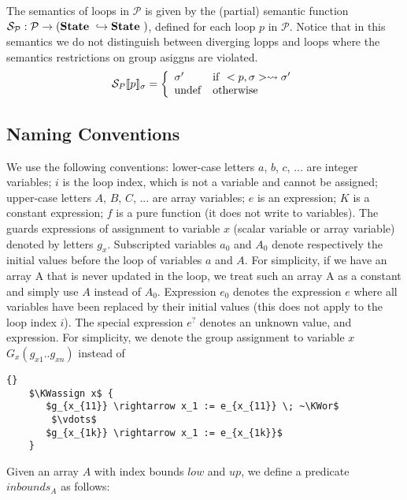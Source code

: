 \documentclass[a4paper,10pt]{article}
\newcommand{\prog}{\ensuremath{\mathcal{P}}\xspace}
\newcommand{\idx}{\ensuremath{i}\xspace}
\newcommand{\KWassign}{\ensuremath{\mathrm{\textbf{assign}}~}}
\newcommand{\KWor}{\ensuremath{\mathrm{\textbf{or}}~}}
\newcommand{\Sstate}{\ensuremath{\mathrm{\textbf{State}}~}}
\newcommand{\SemF}[3]{\ensuremath{#1 \llbracket #2 \rrbracket_{#3} \xspace}}
\newcommand{\Pinbounds}[1]{\ensuremath{\mathit{inbounds}_{#1}}\xspace}
\newcommand{\group}[2]{\ensuremath{\mathit{G}_{#1}(#2)}\xspace}
\begin{document}
The semantics of loops in \prog is given by the (partial) semantic function
${\cal S_P}:  {\cal P} \rightarrow (\Sstate \hookrightarrow \Sstate)$,
defined for each loop $p$ in \prog. Notice that in this semantics we do not 
distinguish between diverging lopps and loops where the semantics restrictions 
on group asiggns are violated.
$$
\SemF{{\cal S}_P}{p}{\sigma} = \left \{
\begin{array}{ll}
\sigma' & \mathrm{if ~} \eval{p}{\sigma} \rightsquigarrow \sigma'\\
\mathrm{undef}  & \mathrm{otherwise}\\
\end{array}
\right.
$$

\subsection{Naming Conventions}
\label{sec:naming-conventions}

We use the following conventions: lower-case letters $a$, $b$, $c$, ... are integer
variables; \idx is the loop index, which is not a variable and cannot be
assigned; upper-case letters $A$, $B$, $C$, ... are array variables; $e$ is an
expression; $K$ is a constant expression; $f$ is a pure function (it does not
write to variables). The guards expressions of assignment to variable $x$ (scalar variable or
array variable) denoted by letters $g_x$. Subscripted variables $a_0$ and $A_0$ denote
respectively the initial values before the loop of variables $a$ and $A$.
For simplicity, if we have an array A that is never updated in the loop, we
treat such an array A as a constant and simply use $A$ instead of $A_0$. 
Expression $e_0$ denotes the expression $e$ where all variables have been replaced by their 
initial values (this does not apply to the loop index \idx).  
The special expression $e^?$ denotes an unknown value, and expression. 
For simplicity, we denote the group assignment to variable $x$  
$\group{x}{g_{x1} .. g_{xn}}$ instead of  
{
\begin{lstlisting}[mathescape]{} 
    $\KWassign x$ {
       $g_{x_{11}} \rightarrow x_1 := e_{x_{11}} \; ~\KWor$
        $\vdots$
       $g_{x_{1k}} \rightarrow x_1 := e_{x_{1k}}$
    }
\end{lstlisting}
}

Given an array $A$ with index bounds $\mathit{low}$ and $\mathit{up}$, we
define a predicate \Pinbounds{A} as follows:
\end{document}
